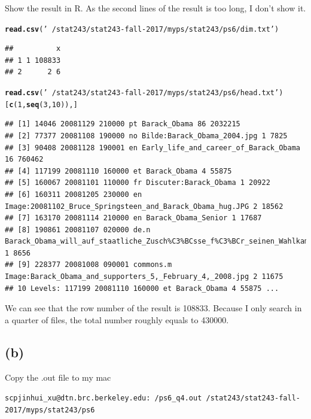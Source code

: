 \documentclass{article}\usepackage[]{graphicx}\usepackage[]{color}
\makeatletter
\newcommand{\hlnum}[1]{\textcolor[rgb]{0.686,0.059,0.569}{#1}}%
\newcommand{\hlstr}[1]{\textcolor[rgb]{0.192,0.494,0.8}{#1}}%
\newcommand{\hlstd}[1]{\textcolor[rgb]{0.345,0.345,0.345}{#1}}%
\newcommand{\hlkwd}[1]{\textcolor[rgb]{0.737,0.353,0.396}{\textbf{#1}}}%
\newenvironment{kframe}{%
 \def\at@end@of@kframe{}%
 \ifinner\ifhmode%
  \def\at@end@of@kframe{\end{minipage}}%
  \begin{minipage}{\columnwidth}%
 \fi\fi%
 \def\FrameCommand##1{\hskip\@totalleftmargin \hskip-\fboxsep
 \colorbox{shadecolor}{##1}\hskip-\fboxsep
     \hskip-\linewidth \hskip-\@totalleftmargin \hskip\columnwidth}%
 \MakeFramed {\advance\hsize-\width
   \@totalleftmargin\z@ \linewidth\hsize
   \@setminipage}}%
 {\par\unskip\endMakeFramed%
 \at@end@of@kframe}
\newenvironment{knitrout}{}{} %
\makeatother
\begin{document}
Show the result in R. As the second lines of the result is too long, I don't show it.
\begin{knitrout}
\color{fgcolor}\begin{kframe}
\begin{alltt}
\hlkwd{read.csv}\hlstd{(}\hlstr{'~/stat243/stat243-fall-2017/myps/stat243/ps6/dim.txt'}\hlstd{)}
\end{alltt}
\begin{verbatim}
##          x
## 1 1 108833
## 2      2 6
\end{verbatim}
\begin{alltt}
\hlkwd{read.csv}\hlstd{(}\hlstr{'~/stat243/stat243-fall-2017/myps/stat243/ps6/head.txt'}\hlstd{)[}\hlkwd{c}\hlstd{(}\hlnum{1}\hlstd{,}\hlkwd{seq}\hlstd{(}\hlnum{3}\hlstd{,}\hlnum{10}\hlstd{)),]}
\end{alltt}
\begin{verbatim}
## [1] 14046 20081129 210000 pt Barack_Obama 86 2032215                                                                       
## [2] 77377 20081108 190000 no Bilde:Barack_Obama_2004.jpg 1 7825                                                            
## [3] 90408 20081128 190001 en Early_life_and_career_of_Barack_Obama 16 760462                                               
## [4] 117199 20081110 160000 et Barack_Obama 4 55875                                                                         
## [5] 160067 20081101 110000 fr Discuter:Barack_Obama 1 20922                                                                
## [6] 160311 20081205 230000 en Image:20081102_Bruce_Springsteen_and_Barack_Obama_hug.JPG 2 18562                            
## [7] 163170 20081114 210000 en Barack_Obama_Senior 1 17687                                                                  
## [8] 190861 20081107 020000 de.n Barack_Obama_will_auf_staatliche_Zusch%C3%BCsse_f%C3%BCr_seinen_Wahlkampf_verzichten 1 8656
## [9] 228377 20081008 090001 commons.m Image:Barack_Obama_and_supporters_5,_February_4,_2008.jpg 2 11675                     
## 10 Levels: 117199 20081110 160000 et Barack_Obama 4 55875 ...
\end{verbatim}
\end{kframe}
\end{knitrout}
We can see that the row number of the result is 108833. Because I only search in a quarter of files, the total number roughly equals to 430000. 

\subsection{(b)}
Copy the .out file to my mac
\begin{knitrout}
\color{fgcolor}\begin{kframe}
\begin{alltt}
scp jinhui_xu@dtn.brc.berkeley.edu:~/ps6_q4.out ~/stat243/stat243-fall-2017/myps/stat243/ps6
\end{alltt}
\end{kframe}
\end{knitrout}
\end{document}
